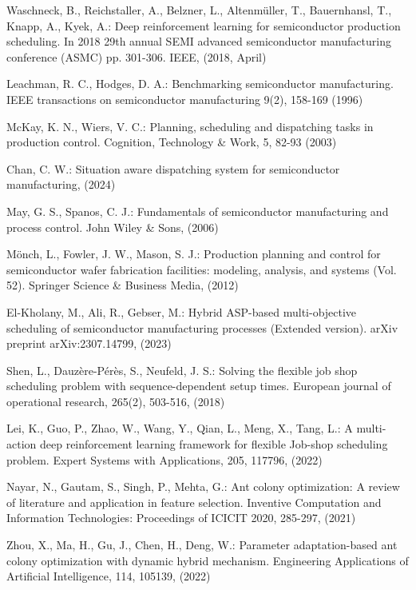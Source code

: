 \begin{thebibliography}{8}
	Waschneck, B., Reichstaller, A., Belzner, L., Altenmüller, T., Bauernhansl, T., Knapp, A., Kyek, A.: Deep reinforcement learning for semiconductor production scheduling. In 2018 29th annual SEMI advanced semiconductor manufacturing conference (ASMC) pp. 301-306. IEEE, (2018, April)
	
	Leachman, R. C., Hodges, D. A.: Benchmarking semiconductor manufacturing. IEEE transactions on semiconductor manufacturing 9(2), 158-169 (1996)
	
	McKay, K. N., Wiers, V. C.: Planning, scheduling and dispatching tasks in production control. Cognition, Technology \& Work, 5, 82-93 (2003)
	
	Chan, C. W.: Situation aware dispatching system for semiconductor manufacturing, (2024)
	
	May, G. S., Spanos, C. J.: Fundamentals of semiconductor manufacturing and process control. John Wiley \& Sons, (2006)
	
	Mönch, L., Fowler, J. W., Mason, S. J.: Production planning and control for semiconductor wafer fabrication facilities: modeling, analysis, and systems (Vol. 52). Springer Science \& Business Media, (2012) 

	El-Kholany, M., Ali, R., Gebser, M.: Hybrid ASP-based multi-objective scheduling of semiconductor manufacturing processes (Extended version). arXiv preprint arXiv:2307.14799,  (2023)
	
	Shen, L., Dauzère-Pérès, S., Neufeld, J. S.: Solving the flexible job shop scheduling problem with sequence-dependent setup times. European journal of operational research, 265(2), 503-516, (2018)
	
	Lei, K., Guo, P., Zhao, W., Wang, Y., Qian, L., Meng, X., Tang, L.: A multi-action deep reinforcement learning framework for flexible Job-shop scheduling problem. Expert Systems with Applications, 205, 117796, (2022)
	
	Nayar, N., Gautam, S., Singh, P., Mehta, G.: Ant colony optimization: A review of literature and application in feature selection. Inventive Computation and Information Technologies: Proceedings of ICICIT 2020, 285-297, (2021)
	
	Zhou, X., Ma, H., Gu, J., Chen, H., Deng, W.: Parameter adaptation-based ant colony optimization with dynamic hybrid mechanism. Engineering Applications of Artificial Intelligence, 114, 105139,  (2022)
	

\end{thebibliography}
